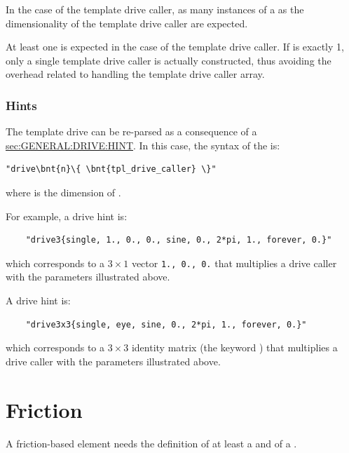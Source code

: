 In the case of the  template drive caller,
as many instances of a  as the dimensionality
of the template drive caller are expected.

At least one  is expected in the case of the 
template drive caller. 
If  is exactly 1, only a single
template drive caller is actually constructed, thus avoiding the overhead 
related to handling the template drive caller array.    

\subsubsection{Hints}
The template drive can be re-parsed as a consequence of a
\hyperref{\kw{hint}}{\kw{hint} (see Section~}{)}{sec:GENERAL:DRIVE:HINT}.
In this case, the syntax of the  is:
\begin{Verbatim}[commandchars=\\\{\}]
    "drive\bnt{n}\{ \bnt{tpl_drive_caller} \}"
\end{Verbatim}
where  is the dimension of .

For example, a  drive hint is:
\begin{verbatim}
    "drive3{single, 1., 0., 0., sine, 0., 2*pi, 1., forever, 0.}"
\end{verbatim}
which corresponds to a $3 \times 1$ vector \texttt{1., 0., 0.} that multiplies
a  drive caller with the parameters illustrated above.

A  drive hint is:
\begin{verbatim}
    "drive3x3{single, eye, sine, 0., 2*pi, 1., forever, 0.}"
\end{verbatim}
which corresponds to a $3 \times 3$ identity matrix (the keyword ) that multiplies
a  drive caller with the parameters illustrated above.







\section{Friction}
A friction-based element needs the definition of
at least a  and of a .

